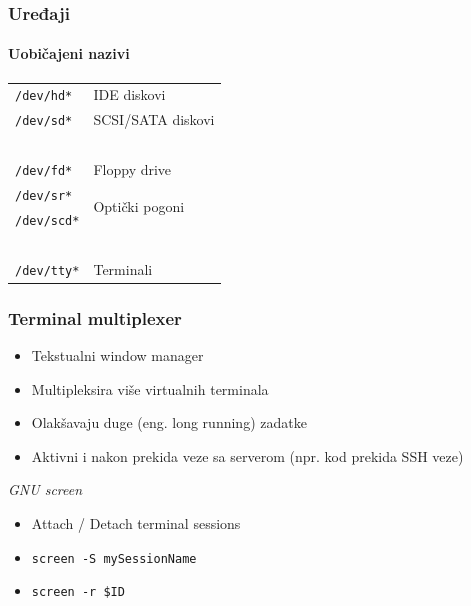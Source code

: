 \documentclass[table,usenames,dvipsnames]{beamer}
\newcommand{\shell}[1]{\texttt{#1}}
\begin{document}
\begin{frame}[t]
	\frametitle{Uređaji}
	\framesubtitle{Uobičajeni nazivi}
	\begin{tabular}{l l}
		\shell{/dev/hd*} & IDE diskovi\\
		\shell{/dev/sd*} & SCSI/SATA diskovi\\
		\,\\
		\shell{/dev/fd*} & Floppy drive\\
		\shell{/dev/sr*} & \multirow{2}{*}{Optički pogoni}\\
		\shell{/dev/scd*} & \\
		\,\\
		\shell{/dev/tty*} & Terminali
	\end{tabular}
\end{frame}

\begin{frame}[t]
	\frametitle{Terminal multiplexer}
	\begin{itemize}
		\item Tekstualni window manager
		\item Multipleksira više virtualnih terminala
	    \item Olakšavaju duge (eng. long running) zadatke
	    \item Aktivni i nakon prekida veze sa serverom (npr. kod prekida SSH veze)
	\end{itemize}
	\vfill
	\textit{GNU screen}
	\begin{itemize}
		\item Attach / Detach terminal sessions
		\item[] \shell{screen -S mySessionName}
		\item[] \shell{screen -r \$ID}
	\end{itemize}
\end{frame}
\end{document}
